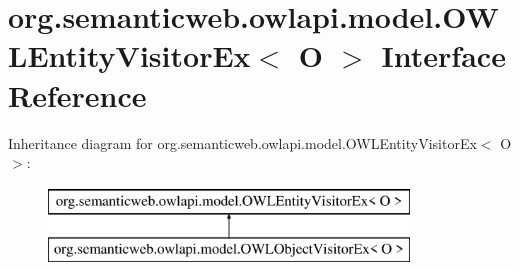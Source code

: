\hypertarget{interfaceorg_1_1semanticweb_1_1owlapi_1_1model_1_1_o_w_l_entity_visitor_ex_3_01_o_01_4}{\section{org.\-semanticweb.\-owlapi.\-model.\-O\-W\-L\-Entity\-Visitor\-Ex$<$ O $>$ Interface Reference}
\label{interfaceorg_1_1semanticweb_1_1owlapi_1_1model_1_1_o_w_l_entity_visitor_ex_3_01_o_01_4}
}
Inheritance diagram for org.\-semanticweb.\-owlapi.\-model.\-O\-W\-L\-Entity\-Visitor\-Ex$<$ O $>$\-:\begin{figure}[H]
\begin{center}
\leavevmode
\includegraphics[height=2.000000cm]{interfaceorg_1_1semanticweb_1_1owlapi_1_1model_1_1_o_w_l_entity_visitor_ex_3_01_o_01_4}
\end{center}
\end{figure}

